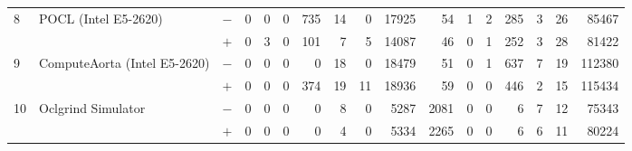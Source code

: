 \begin{tabular}{lll | rrrrrrr | rrrrrrr }
\hline
\multirow{ 2}{*}{8} & \multirow{ 2}{*}{POCL (Intel E5-2620)} & $-$ & 0 & 0 & 0 & 735 & 14 & 0 & 17925       & 54 & 1 & 2 & 285 & 3 & 26 & 85467 \\& & $+$ & 0 & 3 & 0 & 101 & 7 & 5 & 14087 & 46 & 0 & 1 & 252 & 3 & 28 & 81422 \\
\hline
\multirow{ 2}{*}{9} & \multirow{ 2}{*}{ComputeAorta (Intel E5-2620)} & $-$ & 0 & 0 & 0 & 0 & 18 & 0 & 18479       & 51 & 0 & 1 & 637 & 7 & 19 & 112380 \\& & $+$ & 0 & 0 & 0 & 374 & 19 & 11 & 18936 & 59 & 0 & 0 & 446 & 2 & 15 & 115434 \\
\hline
\multirow{ 2}{*}{10} & \multirow{ 2}{*}{Oclgrind Simulator} & $-$ & 0 & 0 & 0 & 0 & 8 & 0 & 5287       & 2081 & 0 & 0 & 6 & 7 & 12 & 75343 \\& & $+$ & 0 & 0 & 0 & 0 & 4 & 0 & 5334 & 2265 & 0 & 0 & 6 & 6 & 11 & 80224 \\
  \bottomrule
\end{tabular}


